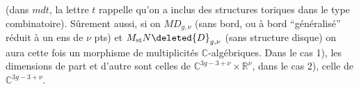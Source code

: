 (dans $mdt$, la lettre $t$ rappelle qu'on a inclus
des structures toriques dans le type
combinatoire). Sûrement aussi, si on
 $MD_{g,\nu}$ (sans bord, ou à bord
``généralisé'' réduit à un ens de $\nu$ pts)
et $M_{\mathrm{st}}N\deleted{D}_{g,\nu}$ (sans structure disque) on
aura
cette fois un morphisme de 
multiplicités  $\mathbb C$-algébriques.
Dans le cas 1), les dimensions  de
part et d'autre sont celles de $\mathbb C^{3g-3+\nu}\times\mathbb R^\nu$,
dans le cas 2),  celle de $\mathbb C^{3g-3+\nu}$.

